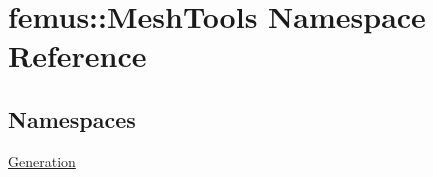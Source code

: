 \hypertarget{namespacefemus_1_1_mesh_tools}{}\section{femus\+:\+:Mesh\+Tools Namespace Reference}
\label{namespacefemus_1_1_mesh_tools}
\subsection*{Namespaces}
\begin{DoxyCompactItemize}
\item 
 \mbox{\hyperlink{namespacefemus_1_1_mesh_tools_1_1_generation}{Generation}}
\end{DoxyCompactItemize}

